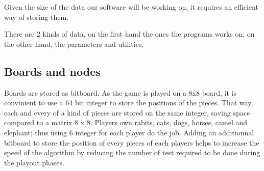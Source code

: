 Given the size of the data our software will be working on, it requires an efficient way of storing them.

There are 2 kinds of data, on the first hand the ones the programs works on; on the other hand, the parameters and utilities.
\subsection{Boards and nodes}
Boards are stored as bitboard. As the game is played on a 8x8 board, it is convinient to use a 64 bit integer to store the positions of the pieces. That way, each and every of a kind of pieces are stored on the same integer, saving space compared to a matrix 8 x 8. Players own rabits, cats, dogs, horses, camel and elephant; thus using 6 integer for each player do the job. Adding an additionnal bitboard to store the position of every pieces of each players helps to increase the speed of the algorithm by reducing the number of test required to be done during the playout phases.

